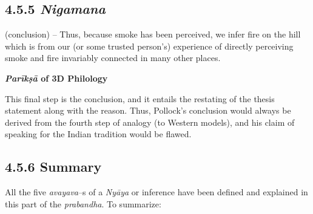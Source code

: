 \subsection*{4.5.5 {\it {\bfseries Nigamana}}}

\vspace{-.2cm}

(conclusion) – Thus, because smoke has been perceived, we infer fire on the hill which is from our (or some trusted person’s) experience of directly perceiving smoke and fire invariably connected in many other places.

\textbf{\textit{Parīkṣā} of 3D Philology}

This final step is the conclusion, and it entails the restating of the thesis statement along with the reason. Thus, Pollock’s conclusion would always be derived from the fourth step of analogy (to Western models), and his claim of speaking for the Indian tradition would be flawed.


\subsection*{4.5.6 Summary}

All the five \textit{avayava}–s of a \textit{Nyāya} or inference have been defined and explained in this part of the \textit{prabandha}. To summarize:

\vspace{-.3cm}

